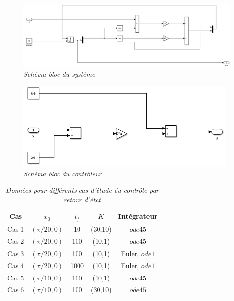 \documentclass[11pt,french]{article} %
\begin{document}
\begin{figure}[H]
    \centering
		\advance\leftskip-2cm
    \includegraphics[width=19cm]{systeme_pend_inv.png} 
		\caption{\textit{Schéma bloc du système}}
		\label{fig:systeme_pend_inv}
\end{figure}
\vspace{0.5cm}

\begin{figure}[H]
    \centering
    \includegraphics[width=11cm]{controle_pend_inv.png} 
		\caption{\textit{Schéma bloc du contrôleur}}
		\label{fig:controle_pend_inv}
\end{figure}
\vspace{0.5cm}

\begin{table}[h!]
\centering
\begin{tabular}{|c c c c c|} 
 \hline
 Cas & $x_0$ & $t_f$ & $K$ & Intégrateur \\ [0.5ex] 
 \hline\hline
 Cas 1 & $(\pi/20,0)$ & 10 & (30,10) & $ode45$ \\ 
 Cas 2 & $(\pi/20,0)$ & 100 & (10,1) & $ode45$ \\
 Cas 3 & $(\pi/20,0)$ & 100 & (10,1) & Euler, $ode1$ \\
 Cas 4 & $(\pi/20,0)$ & 1000 & (10,1) & Euler, $ode1$ \\
 Cas 5 & $(\pi/10,0)$ & 100 & (10,1) & $ode45$ \\ 
 Cas 6 & $(\pi/10,0)$ & 100 & (30,10) & $ode45$ \\ [1ex] 
 \hline
\end{tabular}
\caption{\textit{Données pour différents cas d'étude du contrôle par retour d'état}}
\label{table:1}
\end{table} 
\end{document}
